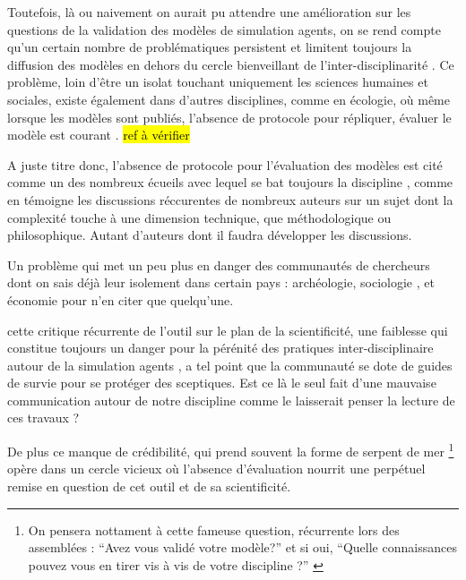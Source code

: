 Toutefois, là ou naivement on aurait pu attendre une amélioration sur les questions de la validation des modèles de simulation agents, on se rend compte qu'un certain nombre de problématiques persistent et limitent toujours la diffusion des modèles en dehors du cercle bienveillant de l'inter-disciplinarité \autocite{Richiardi2006}. Ce problème, loin d'être un isolat touchant uniquement les sciences humaines et sociales, existe également dans d'autres disciplines, comme en écologie, où même lorsque les modèles sont publiés, l'absence de protocole pour répliquer, évaluer le modèle est courant \autocite{Grimm1999}. \hl {ref à vérifier}

A juste titre donc, l'absence de protocole pour l'évaluation des modèles est cité comme un des nombreux écueils avec lequel se bat toujours la discipline \autocite{Heath2009}, comme en témoigne les discussions réccurentes de nombreux auteurs sur un sujet dont la complexité touche à une dimension technique, que méthodologique ou philosophique. Autant d'auteurs \autocite{Richiardi2006} \autocite{Fagiolo2007} \autocite{Moss2008} \autocite{Windrum2007} \autocite{Barlas1996} \autocite{Amblard2003} \autocite{OSullivan2004} \autocite{Doran2000} \autocite{Crooks2012} \autocite{Rouchier2013} dont il faudra développer les discussions.  

Un problème qui met un peu plus en danger des communautés de chercheurs dont on sais déjà leur isolement dans certain pays : archéologie, sociologie \autocite{Manzo2007}, et économie \autocite{Lehtinen2007} \autocite{Richiardi2006} pour n'en citer que quelqu'une. 

cette critique récurrente de l'outil sur le plan de la scientificité, une faiblesse qui constitue toujours un danger pour la pérénité des pratiques inter-disciplinaire autour de la simulation agents \autocite[220]{Squazzoni2010}, a tel point que la communauté se dote de guides de survie pour se protéger des sceptiques. \autocite{Waldherr2013} Est ce là le seul fait d'une mauvaise communication autour de notre discipline comme le laisserait penser la lecture de ces travaux ? 

De plus ce manque de crédibilité, qui prend souvent la forme de serpent de mer \footnote{ On pensera nottament à cette fameuse question, récurrente lors des assemblées : \enquote{Avez vous validé votre modèle?} et si oui, \enquote{Quelle connaissances pouvez vous en tirer vis à vis de votre discipline ?} \autocite{Amblard2006} } opère dans un cercle vicieux où l'absence d'évaluation nourrit une perpétuel remise en question de cet outil et de sa scientificité. %

